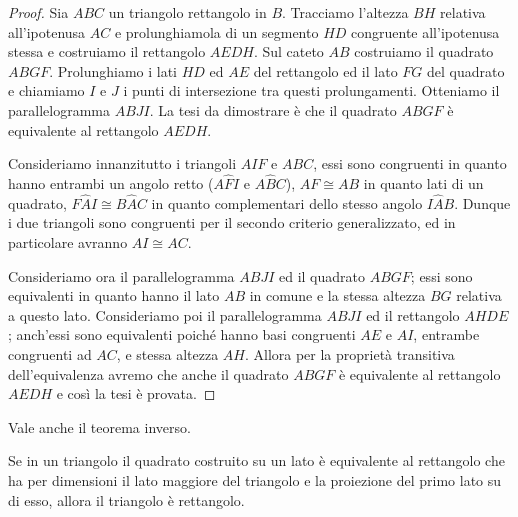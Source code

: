 \noindent\begin{minipage}{0.63\textwidth}\parindent15pt
\begin{proof}
Sia \(ABC\) un triangolo rettangolo in \(B\). Tracciamo l'altezza \(BH\) 
relativa all'ipotenusa \(AC\) e prolunghiamola di un segmento \(HD\) 
congruente all'ipotenusa stessa e costruiamo il rettangolo \(AEDH\). 
Sul cateto \(AB\) costruiamo il quadrato \(ABGF\). Prolunghiamo i lati 
\(HD\) ed \(AE\) del rettangolo ed il lato \(FG\) del quadrato e chiamiamo 
\(I\) e \(J\) i punti di intersezione tra questi prolungamenti. Otteniamo 
il parallelogramma \(ABJI\).
La tesi da dimostrare è che il quadrato \(ABGF\) è equivalente al 
rettangolo \(AEDH\).

Consideriamo innanzitutto i triangoli \(AIF\) e \(ABC\), essi sono 
congruenti in quanto hanno entrambi un angolo retto (\(A\widehat{F}I\) 
e \(A\widehat{B}C\)), \(AF\cong AB\) in quanto lati di un quadrato, 
\(F\widehat{A}I\cong B\widehat{A}C\) in quanto complementari dello 
stesso angolo \(I\widehat{A}B\).
Dunque i due triangoli sono congruenti per il secondo criterio 
generalizzato, ed in particolare avranno \(AI\cong AC\).

Consideriamo ora il parallelogramma \(ABJI\) ed il quadrato \(ABGF\); 
essi sono equivalenti in quanto hanno il lato \(AB\) in comune e la 
stessa altezza \(BG\) relativa a questo lato. 
Consideriamo poi il parallelogramma \(ABJI\) ed il rettangolo \(AHDE\); 
anch'essi sono equivalenti poiché hanno basi congruenti \(AE\) e \(AI\), 
entrambe congruenti ad \(AC\), e stessa altezza \(AH\).
Allora per la proprietà transitiva dell'equivalenza avremo che anche 
il quadrato \(ABGF\) è equivalente al rettangolo \(AEDH\) e così la tesi 
è provata.
\end{proof}
\end{minipage}\hfil
\begin{minipage}{0.37\textwidth}
	\centering
\end{minipage}\vspace{8pt}

Vale anche il teorema inverso.
\begin{teorema}
Se in un triangolo il quadrato costruito su un lato è equivalente al 
rettangolo che ha per dimensioni il lato maggiore del triangolo e la 
proiezione del primo lato su di esso, allora il triangolo è 
rettangolo.
\end{teorema}

